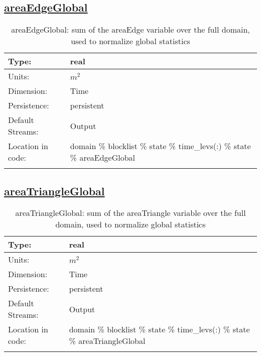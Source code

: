 \subsection[areaEdgeGlobal]{\hyperref[sec:var_tab_state]{areaEdgeGlobal}}
\label{subsec:var_sec_state_areaEdgeGlobal}
\begin{center}
\begin{longtable}{| p{2.0in} | p{4.0in} |}
        \hline 
        Type: & real \\
        \hline 
        Units: & $m^2$ \\
        \hline 
        Dimension: & Time \\
        \hline 
        Persistence: & persistent \\
        \hline 
		 Default Streams: & Output  \\
        \hline 
		 Location in code: & domain \% blocklist \% state \% time\_levs(:) \% state \% areaEdgeGlobal \\
		 \hline 
    \caption{areaEdgeGlobal: sum of the areaEdge variable over the full domain, used to normalize global statistics}
\end{longtable}
\end{center}
\subsection[areaTriangleGlobal]{\hyperref[sec:var_tab_state]{areaTriangleGlobal}}
\label{subsec:var_sec_state_areaTriangleGlobal}
\begin{center}
\begin{longtable}{| p{2.0in} | p{4.0in} |}
        \hline 
        Type: & real \\
        \hline 
        Units: & $m^2$ \\
        \hline 
        Dimension: & Time \\
        \hline 
        Persistence: & persistent \\
        \hline 
		 Default Streams: & Output  \\
        \hline 
		 Location in code: & domain \% blocklist \% state \% time\_levs(:) \% state \% areaTriangleGlobal \\
		 \hline 
    \caption{areaTriangleGlobal: sum of the areaTriangle variable over the full domain, used to normalize global statistics}
\end{longtable}
\end{center}
